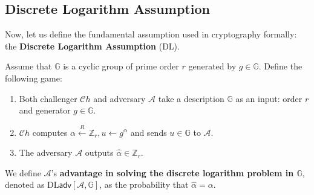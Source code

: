\documentclass[../lecture-notes-148x210.tex]{subfiles}
\begin{document}




\subsection{Discrete Logarithm Assumption}

Now, let us define the fundamental assumption used in cryptography formally: the \textbf{Discrete Logarithm Assumption} (DL).

\begin{definition}
    Assume that $\mathbb{G}$ is a cyclic group of prime order $r$ generated by $g \in \mathbb{G}$. Define the following game:
    \begin{enumerate}
        \item Both challenger $\mathcal{C}h$ and adversary $\mathcal{A}$ take a description $\mathbb{G}$ as an input: order $r$ and generator $g \in \mathbb{G}$.
        \item $\mathcal{C}h$ computes $\alpha \xleftarrow{R} \mathbb{Z}_r, u \gets g^{\alpha}$ and sends $u \in \mathbb{G}$ to $\mathcal{A}$.
        \item The adversary $\mathcal{A}$ outputs $\hat{\alpha} \in \mathbb{Z}_r$.
    \end{enumerate}

    We define $\mathcal{A}$'s \textbf{advantage in solving the discrete logarithm problem in $\mathbb{G}$}, denoted as $\text{DL}\mathsf{adv}[\mathcal{A},\mathbb{G}]$, as the probability that $\hat{\alpha} = \alpha$.
\end{definition}
\end{document}
